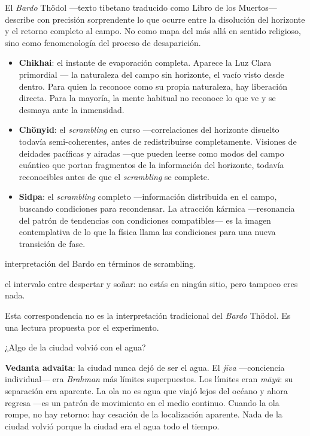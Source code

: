 \noindent El \emph{Bardo} Thödol —texto tibetano traducido como Libro de los Muertos— describe con precisión sorprendente lo que ocurre entre la disolución del horizonte y el retorno completo al campo. No como mapa del más allá en sentido religioso, sino como fenomenología del proceso de desaparición.

\begin{itemize}
\item \textbf{Chikhai}: el instante de evaporación completa. Aparece la Luz Clara primordial — la naturaleza del campo sin horizonte, el vacío visto desde dentro. Para quien la reconoce como su propia naturaleza, hay liberación directa. Para la mayoría, la mente habitual no reconoce lo que ve y se desmaya ante la inmensidad.
\item \textbf{Chönyid}: el \emph{scrambling} en curso —correlaciones del horizonte disuelto todavía semi-coherentes, antes de redistribuirse completamente. Visiones de deidades pacíficas y airadas —que pueden leerse como modos del campo cuántico que portan fragmentos de la información del horizonte, todavía reconocibles antes de que el \emph{scrambling} se complete.
\item \textbf{Sidpa}: el \emph{scrambling} completo —información distribuida en el campo, buscando condiciones para recondensar. La atracción kármica —resonancia del patrón de tendencias con condiciones compatibles— es la imagen contemplativa de lo que la física llama las condiciones para una nueva transición de fase.
\end{itemize}
\begin{fisica}
 interpretación del Bardo en términos de scrambling.

 el intervalo entre despertar y soñar: no estás en ningún sitio, pero tampoco eres nada.
\end{fisica}
Esta correspondencia no es la interpretación tradicional del \emph{Bardo} Thödol. Es una lectura propuesta por el experimento.

\noindent ¿Algo de la ciudad volvió con el agua?

\textbf{Vedanta advaita}: la ciudad nunca dejó de ser el agua. El \emph{jīva} —conciencia individual— era \emph{Brahman} más límites superpuestos. Los límites eran \emph{māyā}: su separación era aparente. La ola no es agua que viajó lejos del océano y ahora regresa —es un patrón de movimiento en el medio continuo. Cuando la ola rompe, no hay retorno: hay cesación de la localización aparente. Nada de la ciudad volvió porque la ciudad era el agua todo el tiempo.

